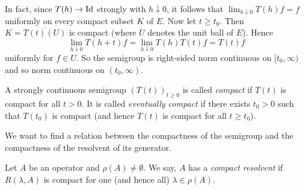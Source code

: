 In fact, since $T(h) \to \operatorname{Id} $ strongly with $h \downarrow 0$, it follows that $\lim_{h \downarrow 0} T(h)f = f$ uniformly on every compact subset $K$ of\/ $E$.
Now let $t \geq t_0$.
Then $K = \overline{T(t)(U)}$ is compact (where $U$ denotes the unit ball of\/ $E$).
Hence 
%
\[
	\lim \limits_{h \downarrow 0} T(h+t)f = \lim \limits_{h \downarrow 0} T(h)T(t)f = T(t)f
\]
%
uniformly for $f \in U$.
So the semigroup is right-sided norm continuous on $[t_0,\infty)$ and so norm continuous on $(t_0,\infty)$.

\begin{definition}\label{def:a2-1.22}
A strongly continuous semigroup $(T(t))_{t\geq 0}$ is called \emph{compact} if\/ $T(t)$ is compact for all $t > 0$. It is called \emph{eventually compact} if there exists $t_0 > 0$ such that $T(t_0)$ is compact (and hence $T(t)$ is compact for all $t \geq t_0$).
\end{definition}

We want to find a relation between the compactness of the semigroup and the compactness of the resolvent of its generator.

\begin{definition}\label{def:a2-1.23}

Let $A$ be an operator and $\rho(A) \neq \emptyset$.
We say, $A$ has a \emph{compact resolvent} if\/ $R(\lambda,A)$ is compact for one (and hence all) $\lambda \in \rho(A)$.
\end{definition}


